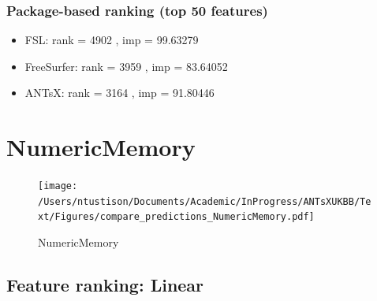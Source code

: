 \documentclass[
  10pt,
]{article}
\begin{document}
\hypertarget{package-based-ranking-top-50-features-2}{%
\subsubsection{Package-based ranking (top 50
features)}\label{package-based-ranking-top-50-features-2}}

\begin{itemize}
\item
  FSL: rank = 4902 , imp = 99.63279
\item
  FreeSurfer: rank = 3959 , imp = 83.64052
\item
  ANTsX: rank = 3164 , imp = 91.80446
\end{itemize}

\clearpage

\hypertarget{numericmemory}{%
\section{NumericMemory}\label{numericmemory}}

\begin{figure}
\centering
\texttt{[image: /Users/ntustison/Documents/Academic/InProgress/ANTsXUKBB/Text/Figures/compare\_predictions\_NumericMemory.pdf]}
\caption{NumericMemory}
\end{figure}

\hypertarget{feature-ranking-linear-3}{%
\subsection{Feature ranking: Linear}\label{feature-ranking-linear-3}}
\end{document}

